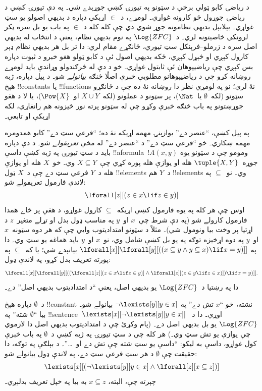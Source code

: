 \documentclass[../../../include/open-logic-section]{subfiles}
\begin{document}


د رياضۍ کابو ټولې برخې د سټونو په تيورۍ کښې جوړېدے شي۔ په دې
تيورۍ کښې د رياضۍ جوړول څو کارونه غواړي۔ لومړے، د~$\in$ اړيکې دپاره
د بديهي اصولو يو سټ غواړي۔ بېلابېل بديهي نظامونه جوړ شوي دي چې کله
کله د~$\in$ په باب يو بل سره ټکر لرونکي خاصيتونه لري۔ د~$\Log{ZFC}$
په نوم بديهي نظام، يعنې د انتخاب له بديهي اصل سره د
زرملو--فرېنکل سټ تيوري، ځانګړے مقام لري: دا تر بل هر بديهي نظام ډېر
کارول کېږي او څېړل کېږي، ځکه بديهي اصول ئې د
کابو ټولو هغو خبرو د ثبوت دپاره بس کېږي چې رياضيپوهان ئې ثابتول
غواړي۔ خو د دې له څرګندولو وړاندې بايد لومړے روښانه کړو چې د
رياضيپوهانو مطلوبې خبرې اصلًا څنګه \emph{بيانولے} شو۔ د پيل دپاره،
ژبه هېڅ !!{constant}s يا !!{function}s نۀ لري؛ نو په لومړي نظر دا
روښانه نۀ ده چې د ځانګړو سټونو (لکه~$\emptyset$ يا~$\Nat$)، پر
سټونو د عملونو (لکه~$X \cup Y$ او~$\Pow{X}$)، يا لا د هغو جوړښتونو
په باب څنګه خبرې وکړو چې له سټونو پرته نور څيزونه هم رانغاړي، لکه
اړيکې او تابعې۔

په پيل کښې، ``عنصر دے'' يوازېنۍ مهمه اړيکه نۀ ده؛ ``فرعي سټ دے''
کابو همدومره مهمه ښکاري۔ خو ``فرعي سټ دے'' د ``عنصر دے'' له مخې
\emph{تعريفولے} شو۔ د دې دپاره بايد د سټ تيورۍ په ژبه کښې داسې
!!a{formula}~$!A(x, y)$ ومومو چې د سټونو يوه جوړه~$\tuple{X, Y}$
هله او يوازې هله پوره کړي چې~$X \subseteq Y$ وي۔ خو~$X$ هله او
يوازې هله د~$Y$ فرعي سټ دے چې د~$X$ ټول !!{element}s د~$Y$ هم
!!{element}s وي۔ نو~$\subseteq$ په لاندې فارمول تعريفولے شو:
\[
\lforall[z][(z \in x \lif z \in y)]
\]
اوس چې هر کله په يوه فارمول کښې اړيکه~$\subseteq$ کارول غواړو، د
هغې پر ځاے همدا فارمول کارولے شو (په دې شرط چې~$x$ او~$y$ په مناسب
ډول بدل او تړلے متغير~$z$ د اړتيا پر وخت بيا ونومول شي)۔ مثلاً د
سټونو امتداديتوب وايي چې که هر دوه سټونه~$x$ او~$y$ په دوه اړخيزه
توګه په يو بل کښې شامل وي، نو~$x$ او~$y$ بايد هماغه يو سټ وي۔ دا په
$\lforall[x][\lforall[y][((x \subseteq y \land y
    \subseteq x) \lif x = y)]]$ بيانېدے شي؛ يا که~$\subseteq$ په
پورته تعريف بدل کړو، په لاندې ډول:
\[
\lforall[x][\lforall[y][((\lforall[z][(z \in x \lif z \in y)] \land
    \lforall[z][(z \in y \lif z \in x)]) \lif x = y)]].
\]
دا په رښتيا د~$\Log{ZFC}$ يو بديهي اصل، يعنې ``د امتداديتوب بديهي
اصل'' دے۔

د~$\emptyset$ دپاره هېڅ !!{constant} نشته، خو ``$x$ تش دے'' په
$\lnot \lexists[y][y \in x]$ بيانولے شو۔ بيا ``$\emptyset$ شته''
په !!{sentence}~$\lexists[x][\lnot \lexists[y][y \in x]]$ اوړي۔
دا د~$\Log{ZFC}$ يو بل بديهي اصل دے۔ (پام وکړئ چې د امتداديتوب
بديهي اصل دا لازموي چې يوازې يو تش سټ وي۔) هر کله چې د سټ تيورۍ په
ژبه کښې د~$\emptyset$ په باب خبرې کول غواړو، داسې به ليکو: ``داسې
يو سټ شته چې تش دے او~\dots''۔ د بېلګې په توګه، دا حقيقت چې
$\emptyset$ د هر سټ فرعي سټ دے، په لاندې ډول بيانولے شو:
\[
\lexists[x][(\lnot\lexists[y][y \in x] \land \lforall[z][x \subseteq
    z])]
\]
چېرته چې، البته، $x \subseteq z$ به بيا په خپل تعريف بدلېږي۔
\end{document}

